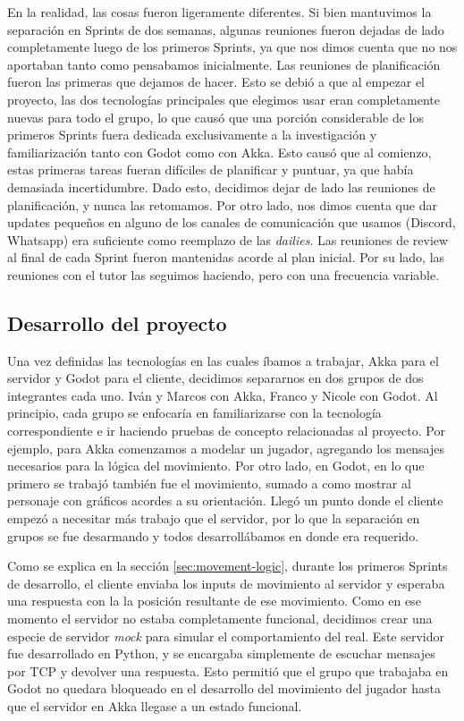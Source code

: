En la realidad, las cosas fueron ligeramente diferentes. Si bien mantuvimos la separación en Sprints de dos semanas, algunas reuniones
fueron dejadas de lado completamente luego de los primeros Sprints, ya que nos dimos cuenta que no nos aportaban tanto como pensabamos
inicialmente.
Las reuniones de planificación fueron las primeras que dejamos de hacer. Esto se debió a que al empezar el proyecto, las 
dos tecnologías principales que elegimos usar eran completamente nuevas para todo el grupo, lo que causó que una porción considerable de
los primeros Sprints fuera dedicada exclusivamente a la investigación y familiarización tanto con Godot como con Akka. Esto causó que al
comienzo, estas primeras tareas fueran difíciles de planificar y puntuar, ya que había demasiada incertidumbre. Dado esto, decidimos dejar
de lado las reuniones de planificación, y nunca las retomamos.
Por otro lado, nos dimos cuenta que dar updates pequeños en alguno de los canales de comunicación que usamos (Discord, Whatsapp) era suficiente
como reemplazo de las \textit{dailies}.
Las reuniones de review al final de cada Sprint fueron mantenidas acorde al plan inicial.
Por su lado, las reuniones con el tutor las seguimos haciendo, pero con una frecuencia variable.

\subsection{Desarrollo del proyecto}
Una vez definidas las tecnologías en las cuales íbamos a trabajar, Akka para el servidor y Godot para el cliente, decidimos separarnos
en dos grupos de dos integrantes cada uno. Iván y Marcos con Akka, Franco y Nicole con Godot. Al principio, cada grupo se enfocaría en 
familiarizarse con la tecnología correspondiente e ir haciendo pruebas de concepto relacionadas al proyecto. Por ejemplo, para Akka 
comenzamos a modelar un jugador, agregando los mensajes necesarios para la lógica del movimiento. Por otro lado, en Godot, en lo que primero
se trabajó también fue el movimiento, sumado a como mostrar al personaje con gráficos acordes a su orientación.
Llegó un punto donde el cliente empezó a necesitar más trabajo que el servidor, por lo que la separación en grupos se fue desarmando y
todos desarrollábamos en donde era requerido.

Como se explica en la sección \ref{sec:movement-logic}, durante los primeros Sprints de desarrollo, el cliente enviaba los inputs de movimiento al servidor y esperaba una respuesta con la
la posición resultante de ese movimiento. Como en ese momento el servidor no estaba completamente funcional, decidimos crear una especie de servidor
\textit{mock} para simular el comportamiento del real. Este servidor fue desarrollado en Python, y se encargaba simplemente de escuchar mensajes por TCP
y devolver una respuesta. Esto permitió que el grupo que trabajaba en Godot no quedara bloqueado en el desarrollo del movimiento del jugador
hasta que el servidor en Akka llegase a un estado funcional.

